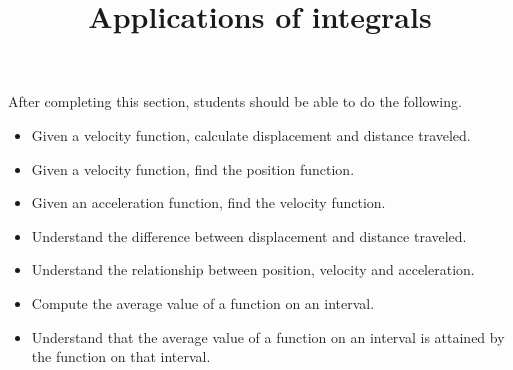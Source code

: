 \documentclass{ximera}
\title{Applications of integrals}
\begin{document}
\begin{abstract}
\end{abstract}

\maketitle

\begin{sectionOutcomes}

After completing this section, students should be able to do the following.

\begin{itemize}
	\item Given a velocity function, calculate displacement and distance traveled.
	\item Given a velocity function, find the position function.
	\item Given an acceleration function, find the velocity function.
	\item Understand the difference between displacement and distance traveled.
	\item Understand the relationship between position, velocity and acceleration.
	\item Compute the average value of a function on an interval.
	\item Understand that the average value of a function on an interval is attained by the function on that interval.
\end{itemize}

\end{sectionOutcomes}
\end{document}
